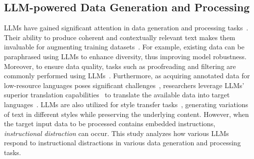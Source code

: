 \subsection{LLM-powered Data Generation and Processing}

LLMs have gained significant attention in data generation and processing tasks~\cite{gandhi2024better,long2024llms,guo2024generative}. 
Their ability to produce coherent and contextually relevant text makes them invaluable for augmenting training datasets~\cite{gilardi2023chatgpt,rosenbaum2023using,he2023annollm,singh2023beyond,macias2024finetuning}. 
For example, existing data can be paraphrased using LLMs to enhance diversity, thus improving model robustness. 
Moreover, to ensure data quality, tasks such as proofreading and filtering are commonly performed using LLMs~\cite{lin2024criticbench}.
Furthermore, as acquiring annotated data for low-resource languages poses significant challenges~\cite{magueresse2020low}, researchers leverage LLMs' superior translation capabilities~\cite{vilar2022prompting,zhang2023prompting} to translate the available data into target languages~\cite{zhang2021bstc,yang2023bigtranslate}. 
LLMs are also utilized for style transfer tasks~\cite{jin2022deep,mukherjee2024text}, generating variations of text in different styles while preserving the underlying content. 
However, when the target input data to be processed contains embedded instructions, \textit{instructional distraction} can occur. This study analyzes how various LLMs respond to instructional distractions in various data generation and processing tasks.


